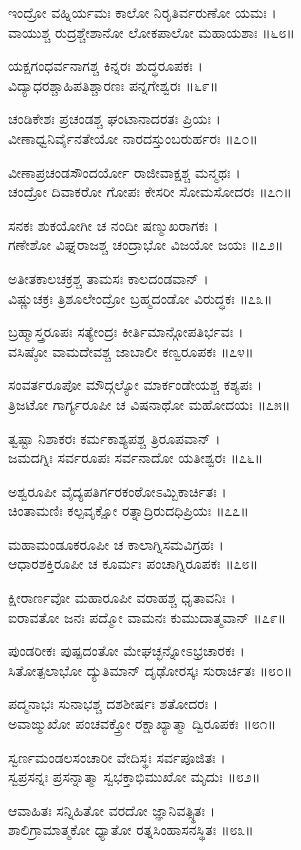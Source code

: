 ಇಂದ್ರೋ ವಹ್ನಿರ್ಯಮಃ ಕಾಲೋ ನಿರೃತಿರ್ವರುಣೋ ಯಮಃ ।\\
ವಾಯುಶ್ಚ ರುದ್ರಶ್ಚೇಶಾನೋ ಲೋಕಪಾಲೋ ಮಹಾಯಶಾಃ ॥೬೮॥

ಯಕ್ಷಗಂಧರ್ವನಾಗಶ್ಚ ಕಿನ್ನರಃ ಶುದ್ಧರೂಪಕಃ ।\\
ವಿದ್ಯಾಧರಶ್ಚಾಹಿಪತಿಶ್ಚಾರಣಃ ಪನ್ನಗೇಶ್ವರಃ ॥೬೯॥

ಚಂಡಿಕೇಶಃ ಪ್ರಚಂಡಶ್ಚ ಘಂಟಾನಾದರತಃ ಪ್ರಿಯಃ ।\\
ವೀಣಾಧ್ವನಿರ್ವೈನತೇಯೋ ನಾರದಸ್ತುಂಬರುರ್ಹರಃ ॥೭೦॥

ವೀಣಾಪ್ರಚಂಡಸೌಂದರ್ಯೋ ರಾಜೀವಾಕ್ಷಶ್ಚ ಮನ್ಮಥಃ ।\\
ಚಂದ್ರೋ ದಿವಾಕರೋ ಗೋಪಃ ಕೇಸರೀ ಸೋಮಸೋದರಃ ॥೭೧॥

ಸನಕಃ ಶುಕಯೋಗೀ ಚ ನಂದೀ ಷಣ್ಮುಖರಾಗಕಃ ।\\
ಗಣೇಶೋ ವಿಘ್ನರಾಜಶ್ಚ ಚಂದ್ರಾಭೋ ವಿಜಯೋ ಜಯಃ ॥೭೨॥

ಅತೀತಕಾಲಚಕ್ರಶ್ಚ ತಾಮಸಃ ಕಾಲದಂಡವಾನ್ ।\\
ವಿಷ್ಣುಚಕ್ರಃ ತ್ರಿಶೂಲೇಂದ್ರೋ ಬ್ರಹ್ಮದಂಡೋ ವಿರುದ್ಧಕಃ ॥೭೩॥

ಬ್ರಹ್ಮಾಸ್ತ್ರರೂಪಃ ಸತ್ಯೇಂದ್ರಃ ಕೀರ್ತಿಮಾನ್ಗೋಪತಿರ್ಭವಃ ।\\
ವಸಿಷ್ಠೋ ವಾಮದೇವಶ್ಚ ಜಾಬಾಲೀ ಕಣ್ವರೂಪಕಃ ॥೭೪॥

ಸಂವರ್ತರೂಪೋ ಮೌದ್ಗಲ್ಯೋ ಮಾರ್ಕಂಡೇಯಶ್ಚ ಕಶ್ಯಪಃ ।\\
ತ್ರಿಜಟೋ ಗಾರ್ಗ್ಯರೂಪೀ ಚ ವಿಷನಾಥೋ ಮಹೋದಯಃ ॥೭೫॥

ತ್ವಷ್ಟಾ ನಿಶಾಕರಃ ಕರ್ಮಕಾಶ್ಯಪಶ್ಚ ತ್ರಿರೂಪವಾನ್ ।\\
ಜಮದಗ್ನಿಃ ಸರ್ವರೂಪಃ ಸರ್ವನಾದೋ ಯತೀಶ್ವರಃ ॥೭೬॥

ಅಶ್ವರೂಪೀ ವೈದ್ಯಪತಿರ್ಗರಕಂಠೋಽಮ್ಬಿಕಾರ್ಚಿತಃ ।\\
ಚಿಂತಾಮಣಿಃ ಕಲ್ಪವೃಕ್ಷೋ ರತ್ನಾದ್ರಿರುದಧಿಪ್ರಿಯಃ ॥೭೭॥

ಮಹಾಮಂಡೂಕರೂಪೀ ಚ ಕಾಲಾಗ್ನಿಸಮವಿಗ್ರಹಃ ।\\
ಆಧಾರಶಕ್ತಿರೂಪೀ ಚ ಕೂರ್ಮಃ ಪಂಚಾಗ್ನಿರೂಪಕಃ ॥೭೮॥

ಕ್ಷೀರಾರ್ಣವೋ ಮಹಾರೂಪೀ ವರಾಹಶ್ಚ ಧೃತಾವನಿಃ ।\\
ಐರಾವತೋ ಜನಃ ಪದ್ಮೋ ವಾಮನಃ ಕುಮುದಾತ್ಮವಾನ್ ॥೭೯॥

ಪುಂಡರೀಕಃ ಪುಷ್ಪದಂತೋ ಮೇಘಚ್ಛನ್ನೋಽಭ್ರಚಾರಕಃ ।\\
ಸಿತೋತ್ಪಲಾಭೋ ದ್ಯುತಿಮಾನ್ ದೃಢೋರಸ್ಕಃ ಸುರಾರ್ಚಿತಃ ॥೮೦॥

ಪದ್ಮನಾಭಃ ಸುನಾಭಶ್ಚ ದಶಶೀರ್ಷಃ ಶತೋದರಃ ।\\
ಅವಾಙ್ಮುಖೋ ಪಂಚವಕ್ತ್ರೋ ರಕ್ಷಾಖ್ಯಾತ್ಮಾ ದ್ವಿರೂಪಕಃ ॥೮೧॥

ಸ್ವರ್ಣಮಂಡಲಸಂಚಾರೀ ವೇದಿಸ್ಥಃ ಸರ್ವಪೂಜಿತಃ ।\\
ಸ್ವಪ್ರಸನ್ನಃ ಪ್ರಸನ್ನಾತ್ಮಾ ಸ್ವಭಕ್ತಾಭಿಮುಖೋ ಮೃದುಃ ॥೮೨॥

ಆವಾಹಿತಃ ಸನ್ನಿಹಿತೋ ವರದೋ ಜ್ಞಾನಿವತ್ಸ್ಥಿತಃ ।\\
ಶಾಲಿಗ್ರಾಮಾತ್ಮಕೋ ಧ್ಯಾತೋ ರತ್ನಸಿಂಹಾಸನಸ್ಥಿತಃ ॥೮೩॥

